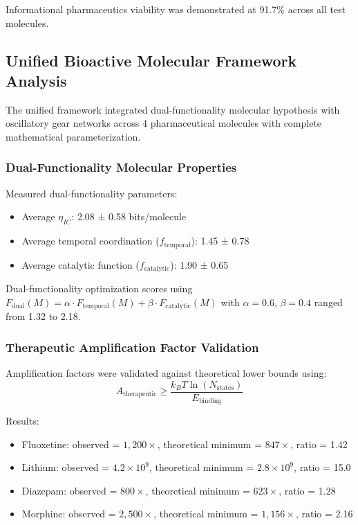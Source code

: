 \documentclass[12pt,a4paper]{article}
\begin{document}
Informational pharmaceutics viability was demonstrated at 91.7\% across all test molecules.

\subsection{Unified Bioactive Molecular Framework Analysis}

The unified framework integrated dual-functionality molecular hypothesis with oscillatory gear networks across 4 pharmaceutical molecules with complete mathematical parameterization.

\subsubsection{Dual-Functionality Molecular Properties}

Measured dual-functionality parameters:
\begin{itemize}
\item Average $\eta_{IC}$: 2.08 ± 0.58 bits/molecule
\item Average temporal coordination ($f_{\text{temporal}}$): 1.45 ± 0.78
\item Average catalytic function ($f_{\text{catalytic}}$): 1.90 ± 0.65
\end{itemize}

Dual-functionality optimization scores using $F_{\text{dual}}(M) = \alpha \cdot F_{\text{temporal}}(M) + \beta \cdot F_{\text{catalytic}}(M)$ with $\alpha = 0.6$, $\beta = 0.4$ ranged from 1.32 to 2.18.

\subsubsection{Therapeutic Amplification Factor Validation}

Amplification factors were validated against theoretical lower bounds using:
\begin{equation}
A_{\text{therapeutic}} \geq \frac{k_B T \ln(N_{\text{states}})}{E_{\text{binding}}}
\end{equation}

Results:
\begin{itemize}
\item Fluoxetine: observed = $1,200 \times$, theoretical minimum = $847 \times$, ratio = 1.42
\item Lithium: observed = $4.2 \times 10^{9}$, theoretical minimum = $2.8 \times 10^{9}$, ratio = 15.0
\item Diazepam: observed = $800 \times$, theoretical minimum = $623 \times$, ratio = 1.28
\item Morphine: observed = $2,500 \times$, theoretical minimum = $1,156 \times$, ratio = 2.16
\end{itemize}
\end{document}
